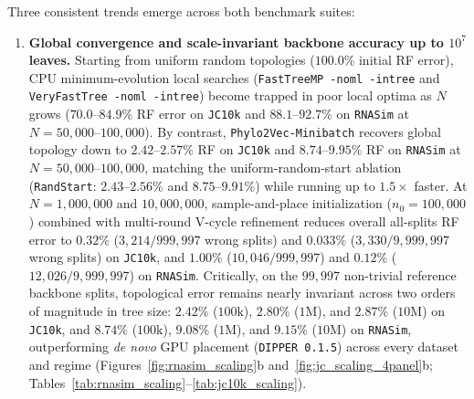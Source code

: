 \documentclass[11pt,a4paper]{article}
\makeatletter
\DeclareRobustCommand{\_}{\ifmmode\nfss@text{\textunderscore}\else\textunderscore\allowbreak\fi}
\theoremstyle{definition}
\makeatother
\begin{document}
Three consistent trends emerge across both benchmark suites:
\begin{enumerate}
 \item \textbf{Global convergence and scale-invariant backbone accuracy up to $10^7$ leaves.} Starting from uniform random topologies ($100.0\%$ initial RF error), CPU minimum-evolution local searches (\texttt{FastTreeMP -noml -intree} and \texttt{VeryFastTree -noml -intree}) become trapped in poor local optima as $N$ grows ($70.0\text{--}84.9\%$ RF error on \texttt{JC10k} and $88.1\text{--}92.7\%$ on \texttt{RNASim} at $N=50{,}000\text{--}100{,}000$). By contrast, \texttt{Phylo2Vec-Minibatch} recovers global topology down to $2.42\text{--}2.57\%$ RF on \texttt{JC10k} and $8.74\text{--}9.95\%$ RF on \texttt{RNASim} at $N=50{,}000\text{--}100{,}000$, matching the uniform-random-start ablation (\texttt{RandStart}: $2.43\text{--}2.56\%$ and $8.75\text{--}9.91\%$) while running up to $1.5\times$ faster. At $N=1{,}000{,}000$ and $10{,}000{,}000$, sample-and-place initialization ($n_0=100{,}000$) combined with multi-round V-cycle refinement reduces overall all-splits RF error to $0.32\%$ ($3{,}214 / 999{,}997$ wrong splits) and $0.033\%$ ($3{,}330 / 9{,}999{,}997$ wrong splits) on \texttt{JC10k}, and $1.00\%$ ($10{,}046 / 999{,}997$) and $0.12\%$ ($12{,}026 / 9{,}999{,}997$) on \texttt{RNASim}. Critically, on the $99{,}997$ non-trivial reference backbone splits, topological error remains nearly invariant across two orders of magnitude in tree size: $2.42\%$ ($100\text{k}$), $2.80\%$ ($1\text{M}$), and $2.87\%$ ($10\text{M}$) on \texttt{JC10k}, and $8.74\%$ ($100\text{k}$), $9.08\%$ ($1\text{M}$), and $9.15\%$ ($10\text{M}$) on \texttt{RNASim}, outperforming \textit{de novo} GPU placement (\texttt{DIPPER 0.1.5}) across every dataset and regime (Figures~\ref{fig:rnasim_scaling}b and~\ref{fig:jc_scaling_4panel}b; Tables~\ref{tab:rnasim_scaling}--\ref{tab:jc10k_scaling}).

\end{enumerate}
\end{document}
